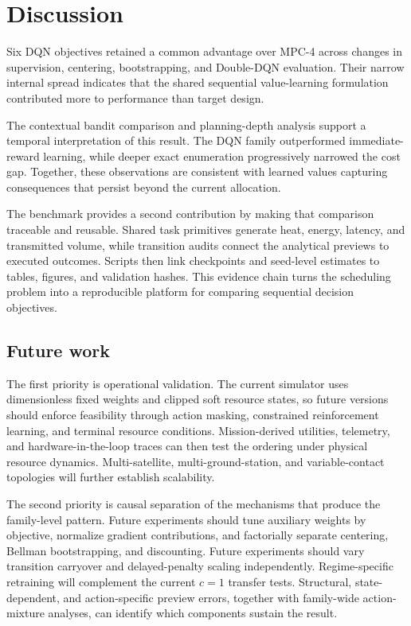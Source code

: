 \documentclass[11pt]{article}
\begin{document}
\section{Discussion}

Six DQN objectives retained a common advantage over MPC-4 across changes in supervision, centering, bootstrapping, and Double-DQN evaluation. Their narrow internal spread indicates that the shared sequential value-learning formulation contributed more to performance than target design.

The contextual bandit comparison and planning-depth analysis support a temporal interpretation of this result. The DQN family outperformed immediate-reward learning, while deeper exact enumeration progressively narrowed the cost gap. Together, these observations are consistent with learned values capturing consequences that persist beyond the current allocation.

The benchmark provides a second contribution by making that comparison traceable and reusable. Shared task primitives generate heat, energy, latency, and transmitted volume, while transition audits connect the analytical previews to executed outcomes. Scripts then link checkpoints and seed-level estimates to tables, figures, and validation hashes. This evidence chain turns the scheduling problem into a reproducible platform for comparing sequential decision objectives.

\subsection{Future work}

The first priority is operational validation. The current simulator uses dimensionless fixed weights and clipped soft resource states, so future versions should enforce feasibility through action masking, constrained reinforcement learning, and terminal resource conditions. Mission-derived utilities, telemetry, and hardware-in-the-loop traces can then test the ordering under physical resource dynamics. Multi-satellite, multi-ground-station, and variable-contact topologies will further establish scalability.

The second priority is causal separation of the mechanisms that produce the family-level pattern. Future experiments should tune auxiliary weights by objective, normalize gradient contributions, and factorially separate centering, Bellman bootstrapping, and discounting. Future experiments should vary transition carryover and delayed-penalty scaling independently. Regime-specific retraining will complement the current $c=1$ transfer tests. Structural, state-dependent, and action-specific preview errors, together with family-wide action-mixture analyses, can identify which components sustain the result.
\end{document}
